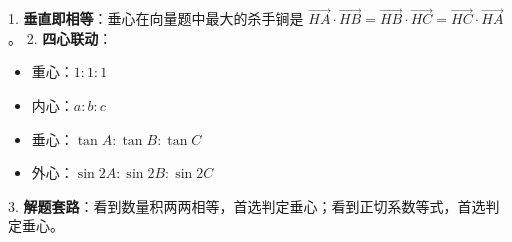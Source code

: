 \begin{summarybox}
1. \textbf{垂直即相等}：垂心在向量题中最大的杀手锏是 $\vec{HA} \cdot \vec{HB} = \vec{HB} \cdot \vec{HC} = \vec{HC} \cdot \vec{HA}$。
2. \textbf{四心联动}：
    \begin{itemize}
        \item 重心：$1:1:1$
        \item 内心：$a:b:c$
        \item 垂心：$\tan A : \tan B : \tan C$
        \item 外心：$\sin 2A : \sin 2B : \sin 2C$
    \end{itemize}
3. \textbf{解题套路}：看到数量积两两相等，首选判定垂心；看到正切系数等式，首选判定垂心。
\end{summarybox}